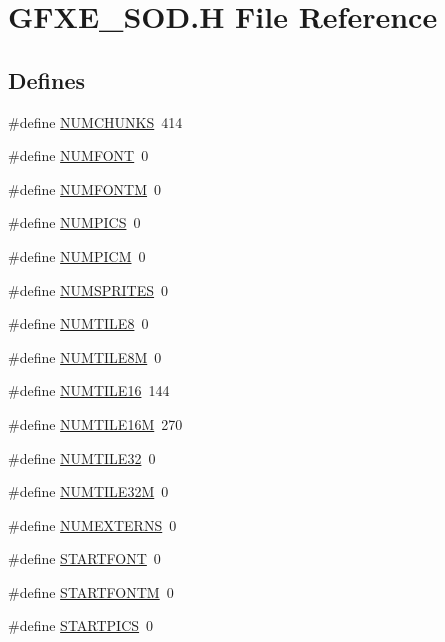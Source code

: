 \hypertarget{GFXE__SOD_8H}{
\section{GFXE\_\-SOD.H File Reference}
\label{GFXE__SOD_8H}
}
\subsection*{Defines}
\begin{DoxyCompactItemize}
\item 
\#define \hyperlink{GFXE__SOD_8H_a06c8b188cc3cdd25a5451beeefddfa66}{NUMCHUNKS}~414
\item 
\#define \hyperlink{GFXE__SOD_8H_a7686ac8ed1dbf71ebee2b4711dae0edd}{NUMFONT}~0
\item 
\#define \hyperlink{GFXE__SOD_8H_afd7a523b060f425fd737a94c044892ac}{NUMFONTM}~0
\item 
\#define \hyperlink{GFXE__SOD_8H_a437727f0f1480aff6a1437f8881e2241}{NUMPICS}~0
\item 
\#define \hyperlink{GFXE__SOD_8H_a2eb878497ab6b2a4f80015a218f38c8f}{NUMPICM}~0
\item 
\#define \hyperlink{GFXE__SOD_8H_ac7e5f97c96cc0101c6f998c7010813a3}{NUMSPRITES}~0
\item 
\#define \hyperlink{GFXE__SOD_8H_a1ad83311a1b6300dcac06636eb1d03b4}{NUMTILE8}~0
\item 
\#define \hyperlink{GFXE__SOD_8H_a99d75e9d203bae79464f2ecd3fd31b8d}{NUMTILE8M}~0
\item 
\#define \hyperlink{GFXE__SOD_8H_a64d23288f15517babe845b31bebdf108}{NUMTILE16}~144
\item 
\#define \hyperlink{GFXE__SOD_8H_a80bd5aa78c52471ba88d9d15baeb5e44}{NUMTILE16M}~270
\item 
\#define \hyperlink{GFXE__SOD_8H_a63d2fe64d989433ecd39d601070bfe04}{NUMTILE32}~0
\item 
\#define \hyperlink{GFXE__SOD_8H_ac85fdf79a513ee60e10cbb347ba5129f}{NUMTILE32M}~0
\item 
\#define \hyperlink{GFXE__SOD_8H_abb86554baf24d8863e54bf20d68120b5}{NUMEXTERNS}~0
\item 
\#define \hyperlink{GFXE__SOD_8H_a91e546d8307de206a3822f7ea9064cb2}{STARTFONT}~0
\item 
\#define \hyperlink{GFXE__SOD_8H_a8e97342cc14d7aed1d20b6ff859f22ef}{STARTFONTM}~0
\item 
\#define \hyperlink{GFXE__SOD_8H_aaf17bc60cff0a0236cafed9026641531}{STARTPICS}~0
\item 

\end{DoxyCompactItemize}
